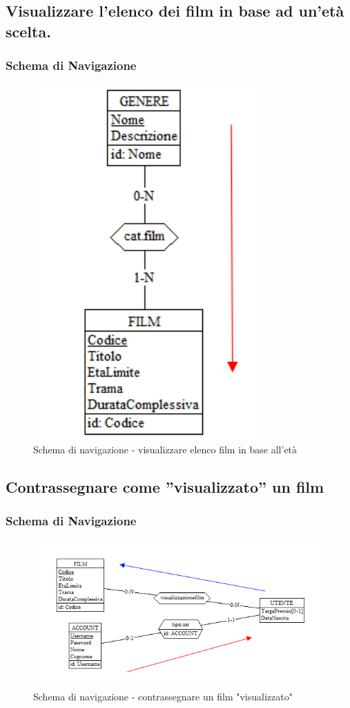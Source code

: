 \documentclass[a4paper,12pt]{report}
\begin{document}
	\subsection{Visualizzare l’elenco dei film in base ad un’età scelta.}
	\subsubsection{Schema di Navigazione}
	\begin{figure}[H]
		\centering
		\includegraphics[width=250pt]{ER/navigazione/visualizzarefilm.png}
		\caption{Schema di navigazione - visualizzare elenco film in base all'età}
	\end{figure}
	\subsection{Contrassegnare come ”visualizzato” un film}
	\subsubsection{Schema di Navigazione}
	\begin{figure}[H]
		\centering
		\includegraphics[width=450pt]{ER/navigazione/visualizzatofilm.png}
		\caption{Schema di navigazione - contrassegnare un film "visualizzato"}
	\end{figure}
\end{document}
